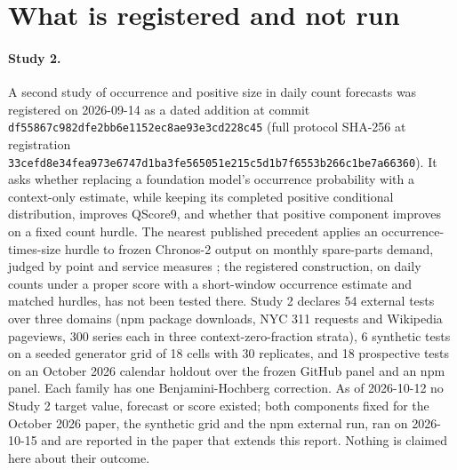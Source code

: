\documentclass[10pt]{article}
\newcommand{\qs}{QScore9}
\begin{document}
\begin{itemize}

\end{itemize}

\section{What is registered and not run}
\label{sec:notrun}



\paragraph{Study 2.} A second study of occurrence and positive size in daily count forecasts was registered
on 2026-09-14 as a dated addition at commit \texttt{df55867c982dfe2bb6e1152ec8ae93e3cd228c45} (full
protocol SHA-256 at registration
\texttt{33cefd8e34fea973e6747d1ba3fe565051e215c5d1b7f6553b266c1be7a66360}). It asks whether replacing a
foundation model's occurrence probability with a context-only estimate, while keeping its completed positive
conditional distribution, improves \qs{}, and whether that positive component improves on a fixed count
hurdle. The nearest published precedent applies an occurrence-times-size hurdle to frozen Chronos-2 output on
monthly spare-parts demand, judged by point and service measures \citep{chin2026}; the registered
construction, on daily counts under a proper score with a short-window occurrence estimate and matched
hurdles, has not been tested there. Study 2 declares 54 external tests over three domains (npm package
downloads, NYC 311 requests and Wikipedia pageviews, 300 series each in three context-zero-fraction strata),
6 synthetic tests on a seeded generator grid of 18 cells with 30 replicates, and 18 prospective tests on an
October 2026 calendar holdout over the frozen GitHub panel and an npm panel. Each family has one
Benjamini-Hochberg correction. As of 2026-10-12 no Study 2 target value, forecast or score existed; both
components fixed for the October 2026 paper, the synthetic grid and the npm external run, ran on 2026-10-15
and are reported in the paper that extends this report. Nothing is claimed here about their outcome.
\end{document}
